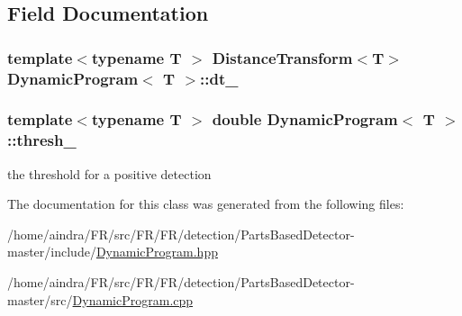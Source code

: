 \subsection{\-Field \-Documentation}
\hypertarget{classDynamicProgram_a6cea0b8559d6a03d81e2003991ab67cf}{
\subsubsection[{dt\-\_\-}]{\setlength{\rightskip}{0pt plus 5cm}template$<$typename T $>$ {\bf \-Distance\-Transform}$<$\-T$>$ {\bf \-Dynamic\-Program}$<$ \-T $>$\-::{\bf dt\-\_\-}}}\label{classDynamicProgram_a6cea0b8559d6a03d81e2003991ab67cf}
\hypertarget{classDynamicProgram_a08f2d4801faa0f964e217b9ac9927ec6}{
\subsubsection[{thresh\-\_\-}]{\setlength{\rightskip}{0pt plus 5cm}template$<$typename T $>$ double {\bf \-Dynamic\-Program}$<$ \-T $>$\-::{\bf thresh\-\_\-}}}\label{classDynamicProgram_a08f2d4801faa0f964e217b9ac9927ec6}


the threshold for a positive detection 



\-The documentation for this class was generated from the following files\-:\begin{DoxyCompactItemize}
\item 
/home/aindra/\-F\-R/src/\-F\-R/\-F\-R/detection/\-Parts\-Based\-Detector-\/master/include/\hyperlink{DynamicProgram_8hpp}{\-Dynamic\-Program.\-hpp}\item 
/home/aindra/\-F\-R/src/\-F\-R/\-F\-R/detection/\-Parts\-Based\-Detector-\/master/src/\hyperlink{DynamicProgram_8cpp}{\-Dynamic\-Program.\-cpp}\end{DoxyCompactItemize}
